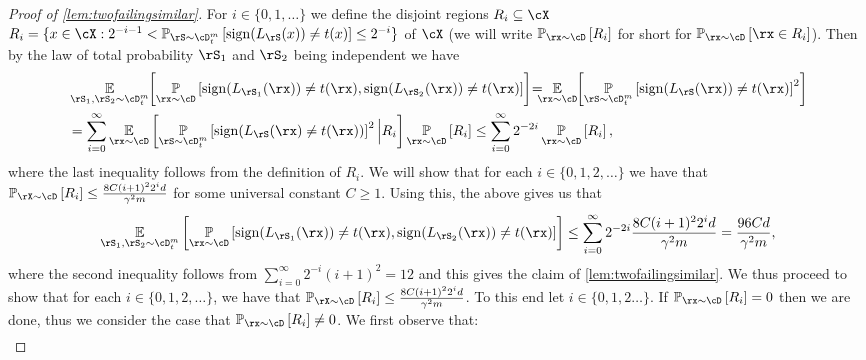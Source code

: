 \begin{proof}[Proof of \cref{lem:twofailingsimilar}]
    For $ i\in \{  0,1,\ldots \}  $ we define the disjoint regions  $ R_{i}\subseteq \cX $ $ R_{i}=\{x\in \cX:2^{-i-1}< \p_{\rS\sim\cD^{m}_{t}}\left[ \sign(L_{\rS}(x)) \not = t(x)  \right]\leq 2^{-i}  \}$  of $ \cX $ (we will write $ \p_{\rx\sim \cD}\left[R_{i}\right] $ for short for $ \p_{\rx\sim\cD}\left[\rx\in R_{i}\right] $). Then by the law of total probability $ \rS_{1} $ and $ \rS_{2} $ being independent we have
    \begin{align}\label{eq:twofailingsimilar2}
        &\e_{\rS_{1},\rS_{2}\sim \cD^{m}_{t}}\negmedspace\left[\p_{\rx\sim\cD}\left[   \sign(L_{\rS_{1}}(\rx))\not=t(\rx),\sign(L_{\rS_{2}}(\rx))\not=t(\rx)\right]\right]
        \negmedspace=\negmedspace\negmedspace\negmedspace\e_{\rx\sim\cD}\negmedspace\left[\p_{\rS\sim \cD^{m}_{t}}\left[   \sign(L_{\rS}(\rx))\not=t(\rx)\right]^{2}\right]\nonumber
        \\
        &= \sum_{i=0}^{\infty}  \e_{\rx\sim\cD}\left[\p_{\rS\sim \cD^{m}_{t}}\left[   \sign(L_{\rS}(\rx)\not=t(\rx))\right]^{2} \Big| R_{i}\right]\p_{\rx\sim\cD}\left[R_{i}\right]
        \leq
        \sum_{i=0}^{\infty}  2^{-2i}\p_{\rx\sim\cD}\left[R_{i}\right],
    \end{align}
    where the last inequality follows from the definition of $ R_{i}$. We will show that for each $ i\in\{  0,1,2,\ldots\}  $ we have that $ \p_{\rX\sim\cD}\left[R_{i}\right] \leq \frac{8C(i+1)^{2}2^{i}d}{\gamma^{2}m}$ for some universal constant   $ C\geq1 $. Using this, the above gives us that 
    \begin{align*}
        \e_{\rS_{1},\rS_{2}\sim \cD^{m}_{t}}\left[\p_{\rx\sim\cD}\left[   \sign(L_{\rS_{1}}(\rx))\not=t(\rx),\sign(L_{\rS_{2}}(\rx))\not=t(\rx)\right]\right]
        \leq
        \sum_{i=0}^{\infty}  2^{-2i}\frac{8C(i+1)^{2}2^{i}d}{\gamma^{2}m}
        =\frac{96Cd}{\gamma^{2}m},
    \end{align*}
    where the second inequality follows from $ \sum_{i=0}^{\infty}2^{-i}(i+1)^{2} =12$ and this gives the claim of \cref{lem:twofailingsimilar}. 
    We thus proceed to show that for each $ i\in\{  0,1,2,\ldots\}  $, we have that $ \p_{\rX\sim\cD}\left[R_{i}\right] \leq \frac{8C(i+1)^{2}2^{i}d}{\gamma^{2}m}$. 
    To this end let $ i\in\{  0,1,2\ldots\}.$ If $ \p_{\rx\sim\cD}\left[R_{i}\right]=0 $ then we are done, thus we consider the case that $ \p_{\rx\sim\cD}\left[R_{i}\right]\not=0 $.
    We first observe that:
    \begin{align*}

\end{align*}
\end{proof}
